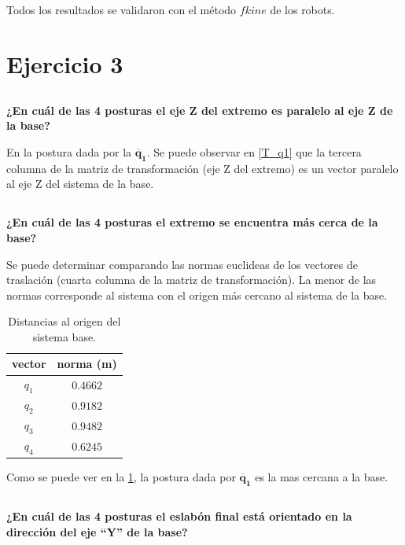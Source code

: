 \documentclass[a4paper,12pt]{article}
\begin{document}
\subsection{}
Todos los resultados se validaron con el método $fkine$ de los robots.

\section{Ejercicio 3}
\subsection{}
\textbf{¿En cuál de las 4 posturas el eje Z del extremo es paralelo al eje Z de la base?}

En la postura dada por la $\mathbf{\overline{q}_1}$. Se puede observar en \cref{T_q1}
que la tercera columna de la matriz de transformación (eje Z del extremo) es un vector
paralelo al eje Z del sistema de la base.

\subsection{}
\textbf{¿En cuál de las 4 posturas el extremo se encuentra más cerca de la base?}

Se puede determinar comparando las normas euclideas de los vectores de traslación (cuarta columna de la matriz de transformación).
La menor de las normas corresponde al sistema con el origen más cercano al sistema de la base.

\begin{table}[H]
    \centering
    \begin{tabular}{|c|c|}
    \hline
    vector & norma (m)      \\ \hline
    $q_1$  & $0.4662$   \\ \hline
    $q_2$  & $0.9182$   \\ \hline
    $q_3$  & $0.9482$   \\ \hline
    $q_4$  & $0.6245$   \\ \hline
    \end{tabular}
    \caption{Distancias al origen del sistema base.}
    \label{normas}
\end{table}

Como se puede ver en la \cref{normas}, la postura dada por $\mathbf{\overline{q}_1}$ es la mas cercana a la base.

\subsection{}
\textbf{¿En cuál de las 4 posturas el eslabón final está orientado en la dirección del eje “Y” de
la base?}
\end{document}
